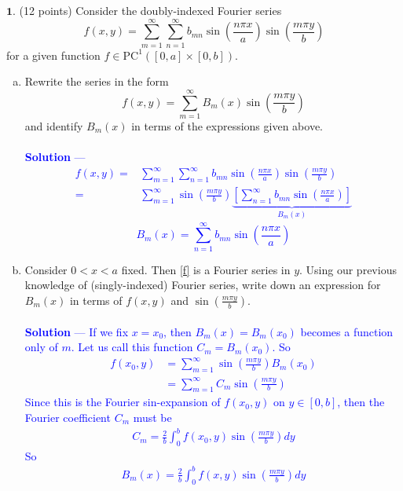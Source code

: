 \documentclass[12pt]{article}
\begin{document}
\noindent $\textbf{1}$. (12 points) Consider the doubly-indexed Fourier series
$$f(x,y) = \sum_{m=1}^\infty \sum_{n=1}^\infty b_{mn} \sin \left ( \frac{n\pi x}{a} \right )\sin \left ( \frac{m\pi y}{b} \right )$$
for a given function $f \in \mathrm{PC}^1 \left ( [0,a] \times [0,b] \right ).$
\begin{enumerate}[(a)]
\item Rewrite the series in the form
\begin{equation}
\label{f}
f(x,y) = \sum_{m=1}^\infty B_m(x) \sin \left ( \frac{m\pi y}{b} \right )
\end{equation}
and identify $B_m(x)$ in terms of the expressions given above. \\ \\
\textcolor{blue}{\textbf{Solution} — 
\begin{align*}
f(x,y) =& \sum_{m=1}^\infty \sum_{n=1}^\infty b_{mn} \sin \left ( \frac{n\pi x}{a} \right )\sin \left ( \frac{m\pi y}{b} \right ) \\
=& \sum_{m=1}^\infty \sin \left ( \frac{m\pi y}{b} \right ) \underbrace{ \left[  \sum_{n=1}^\infty b_{mn} \sin \left ( \frac{n\pi x}{a} \right ) \right] }_{B_m(x)}
\end{align*}
$$\boxed{B_m(x) =  \sum_{n=1}^\infty b_{mn} \sin \left ( \frac{n\pi x}{a} \right )}$$
}

\item Consider $0 < x < a$ fixed. Then \eqref{f} is a Fourier series in $y$. Using our previous knowledge of (singly-indexed) Fourier series, write down an expression for $B_m(x)$ in terms of $f(x,y)$ and $\sin \left ( \frac{m\pi y}{b} \right )$. \\ \\
\textcolor{blue}{\textbf{Solution } — If we fix $x = x_0$, then $B_m(x) = B_m(x_0)$ becomes a function only of $m$. Let us call this function $C_m = B_m(x_0)$. So
\begin{align*}
f(x_0,y) &= \sum_{m=1}^\infty \sin \left ( \frac{m\pi y}{b} \right ) B_m(x_0) \\
&= \sum_{m=1}^\infty C_m \sin \left ( \frac{m\pi y}{b} \right )
\end{align*}
Since this is the Fourier sin-expansion of $f(x_0, y)$ on $y \in [0, b]$, then the Fourier coefficient $C_m$ must be
\begin{align*}
C_m = \frac{2}{b} \int_0^b f(x_0, y) \sin \left( \frac{m \pi y}{b} \right) dy
\end{align*}
So
\begin{align*}
\boxed{B_m(x) = \frac{2}{b} \int_0^b f(x, y) \sin \left( \frac{m \pi y}{b} \right) dy}
\end{align*}
}


\end{enumerate}
\end{document}
